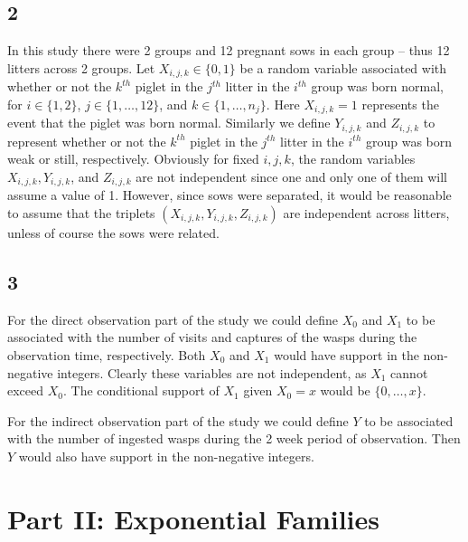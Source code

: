 \documentclass[12pt]{article}
\begin{document}
\subsection*{2}
In this study there were 2 groups and 12 pregnant sows in each group -- thus 12 litters across 2 groups. Let $X_{i,j,k} \in \{0,1\}$ be a random
variable associated with whether or not
the $k^{th}$ piglet in the $j^{th}$ litter in the $i^{th}$ group was born normal, for $i \in \{1, 2\}$, $j \in \{1, \dots, 12\}$, and $k \in \{1,
\dots, n_{j}\}$. Here $X_{i,j,k} = 1$ represents the event that the piglet was born normal. Similarly we define $Y_{i,j,k}$ and $Z_{i,j,k}$ to represent whether or not 
the $k^{th}$ piglet in the $j^{th}$ litter in the $i^{th}$ group was born weak or still, respectively. Obviously for fixed $i, j, k$, the random
variables $X_{i,j,k}, Y_{i,j,k}$, and $Z_{i,j,k}$ are not independent since one and only one of them will assume a value of 1. However, since sows
were separated, it would be reasonable to assume that the triplets $(X_{i,j,k}, Y_{i,j,k}, Z_{i,j,k})$ are independent across litters, unless of
course the sows were related.



\subsection*{3}
For the direct observation part of the study we could define $X_{0}$ and $X_{1}$ to be associated with the number of visits and captures of the wasps 
during the observation time, respectively. Both $X_0$ and $X_1$ would have support in the non-negative integers.
Clearly these variables are not independent, as $X_1$ cannot exceed $X_0$. The conditional support of $X_1$ given $X_0 = x$ would be $\{0,\dots, x\}$.

For the indirect observation part of the study we could define $Y$ to be associated with the number of ingested wasps during the 2 week period of
observation. Then $Y$ would also have support in the non-negative integers. 


\newpage
\section*{Part II: Exponential Families}
\end{document}
